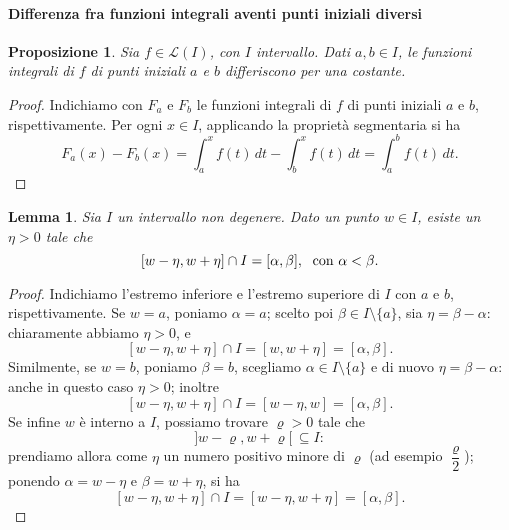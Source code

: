 \documentclass{article}
\theoremstyle{plain}
\newtheorem{lem}[thm]{Lemma}
\newtheorem{prop}[thm]{Proposizione}
\theoremstyle{definition}
\theoremstyle{remark}
\begin{document}
\vspace{10pt}

\paragraph{Differenza fra funzioni integrali aventi punti iniziali diversi}
\begin{bxthm}
\begin{prop}
    Sia $f\in\mathcal{L}(I)$, con $I$ intervallo. 
    Dati $a,b\in I$, le funzioni integrali di $f$ di punti iniziali $a$ e $b$ differiscono per una costante.
\end{prop}
\end{bxthm}
\begin{proof}
    Indichiamo con $F_a$ e $F_b$ le funzioni integrali di $f$ di punti iniziali $a$ e $b$, rispettivamente. 
    Per ogni $x\in I$, applicando la proprietà segmentaria si ha 
    \[F_a(x)-F_b(x)=\int_{a}^{x}f(t)\,dt-\int_{b}^{x}f(t)\,dt=\int_{a}^{b}f(t)\,dt.\]
\end{proof}

\vspace{10pt}

\begin{bxthm}
\begin{lem}
    Sia $I$ un intervallo non degenere. 
    Dato un punto $w\in I$, esiste un $\eta>0$ tale che 
    \[[w-\eta,w+\eta]\cap I=[\alpha,\beta],\;\textup{ con }\alpha<\beta.\]
\end{lem}
\end{bxthm}
\begin{proof}
    Indichiamo l'estremo inferiore e l'estremo superiore di $I$ con $a$ e $b$, rispettivamente.
    Se $w=a$, poniamo $\alpha=a$; scelto poi $\beta\in I\setminus\{a\}$, sia $\eta=\beta-\alpha$: chiaramente abbiamo $\eta>0$, e 
    \[[w-\eta,w+\eta]\cap I=[w,w+\eta]=[\alpha,\beta].\]
    Similmente, se $w=b$, poniamo $\beta=b$, scegliamo $\alpha\in I\setminus\{a\}$ e di nuovo $\eta=\beta-\alpha$: 
    anche in questo caso $\eta>0$; inoltre \[[w-\eta,w+\eta]\cap I=[w-\eta,w]=[\alpha,\beta].\]
    Se infine $w$ è interno a $I$, possiamo trovare $\varrho >0$ tale che \[]w-\varrho,w+\varrho[\,\subseteq I:\] 
    prendiamo allora come $\eta$ un numero positivo minore di $\varrho$ (ad esempio $\dfrac{\varrho}{2}$);
    ponendo $\alpha=w-\eta$ e $\beta=w+\eta$, si ha \[[w-\eta,w+\eta]\cap I=[w-\eta,w+\eta]=[\alpha,\beta].\]
\end{proof}

\vspace{10pt}
\end{document}
